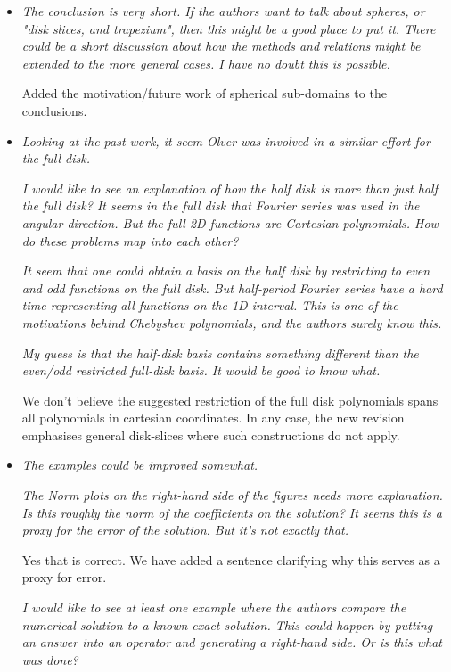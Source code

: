 \documentclass[10pt]{letter}
\newcommand{\comment}[1]{\textit{\color{bluey}#1}}
\begin{document}
\begin{itemize}[parsep=1em,leftmargin=1em]
\item \comment{The conclusion is very short. If the authors want to talk about spheres, or "disk slices, and trapezium", then this might be a good place to put it. There could be a short discussion about how the methods and relations might be extended to the more general cases. I have no doubt this is possible.}

Added the motivation/future work of spherical sub-domains to the conclusions.


\item \comment{Looking at the past work, it seem Olver was involved in a similar effort for the full disk.}

\comment{I would like to see an explanation of how the half disk is more than just half the full disk? It seems in the full disk that Fourier series was used in the angular direction. But the full 2D functions are Cartesian polynomials. How do these problems map into each other? }

\comment{It seem that one could obtain a basis on the half disk by restricting to even and odd functions on the full disk. But half-period Fourier series have a hard time representing all functions on the 1D interval. This is one of the motivations behind Chebyshev polynomials, and the authors surely know this.} 

\comment{My guess is that the half-disk basis contains something different than the even/odd restricted full-disk basis. It would be good to know what.}

We don't believe the suggested restriction of the full disk polynomials  spans all polynomials in cartesian coordinates. In any case, the new revision emphasises general disk-slices where such constructions do not apply. 


\item \comment{The examples could be improved somewhat.}

\comment{The Norm plots on the right-hand side of the figures needs more explanation. Is this roughly the norm of the coefficients on the solution? It seems this is a proxy for the error of the solution. But it's not exactly that. }

Yes that is correct. We have added a sentence clarifying why this serves as a proxy for error.

\comment{I would like to see at least one example where the authors compare the numerical solution to a known exact solution. This could happen by putting an answer into an operator and generating a right-hand side. Or is this what was done?}


\end{itemize}
\end{document}
